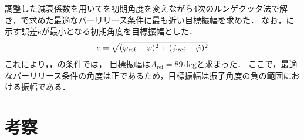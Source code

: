         調整した減衰係数を用いてを初期角度を変えながら4次のルンゲクッタ法で解き，で求めた最適なバーリリース条件に最も近い目標振幅を求めた．
        なお，に示す誤差$e$が最小となる初期角度を目標振幅とした．
        \begin{eqnarray}
          \equlabel{error}
          e=\sqrt{(\varphi_{\mathrm{ref}}-\varphi)^2+(\dot{\varphi}_{\mathrm{ref}}-\dot{\varphi})^2}
          \end{eqnarray}
        これにより，，の条件では，
        目標振幅は$A_{\mathrm{ref}}=89\,\mathrm{deg}$と求まった．
        ここで，最適なバーリリース条件の角度は正であるため，目標振幅は振子角度の負の範囲における振幅である．

      

        \section{考察}
